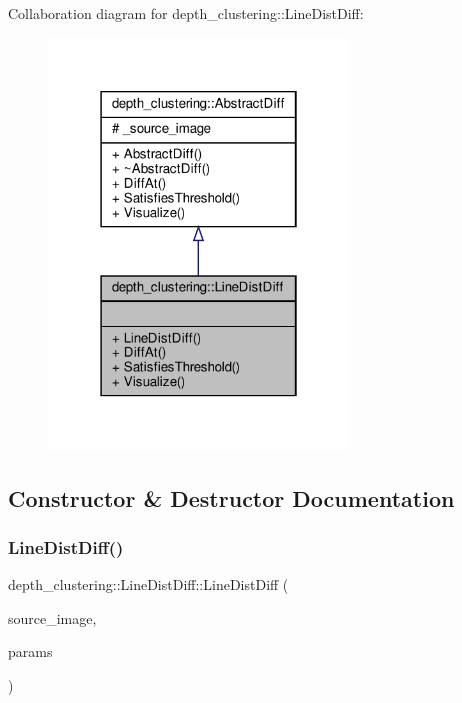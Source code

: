 Collaboration diagram for depth\+\_\+clustering\+:\+:Line\+Dist\+Diff\+:\nopagebreak
\begin{figure}[H]
\begin{center}
\leavevmode
\includegraphics[width=226pt]{classdepth__clustering_1_1LineDistDiff__coll__graph}
\end{center}
\end{figure}


\subsection{Constructor \& Destructor Documentation}
\mbox{\label{classdepth__clustering_1_1LineDistDiff_af922d3e19bc52a2fdbf36317fc474d88}} 
\subsubsection{\texorpdfstring{Line\+Dist\+Diff()}{LineDistDiff()}}
{\footnotesize\ttfamily depth\+\_\+clustering\+::\+Line\+Dist\+Diff\+::\+Line\+Dist\+Diff (\begin{DoxyParamCaption}\item[{const cv\+::\+Mat $\ast$}]{source\+\_\+image,  }\item[{const \hyperlink{classdepth__clustering_1_1ProjectionParams}{Projection\+Params} $\ast$}]{params }\end{DoxyParamCaption})}



